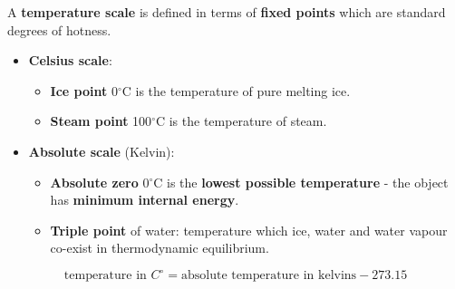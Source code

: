 A \textbf{temperature scale} is defined in terms of \textbf{fixed points} which are standard degrees of hotness.
\begin{itemize}
    \item \textbf{Celsius scale}:
        \begin{itemize}
            \item \textbf{Ice point} 0$^\circ$C is the temperature of pure melting ice.
            \item \textbf{Steam point} 100$^\circ$C is the temperature of steam.
        \end{itemize}
    \item \textbf{Absolute scale} (Kelvin): 
        \begin{itemize}
            \item \textbf{Absolute zero} 0$^\circ$C is the \textbf{lowest possible temperature} - the object has \textbf{minimum internal energy}.
            \item \textbf{Triple point} of water: temperature which ice, water and water vapour co-exist in thermodynamic equilibrium.
        \end{itemize}
\end{itemize}

$$\text{temperature in $C^\circ$}=\text{absolute temperature in kelvins}-273.15$$

